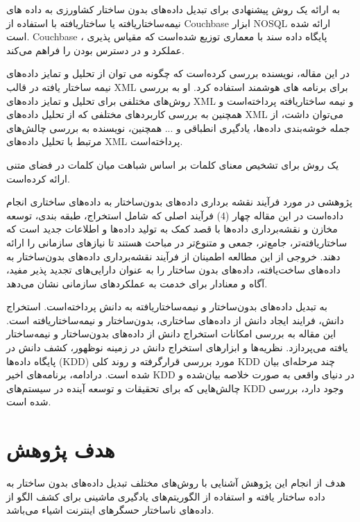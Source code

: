 \cite{sambrekar2018}
به ارائه یک روش پیشنهادی برای تبدیل داده‌های بدون ساختار کشاورزی به داده های نیمه‌ساختار‌یافته یا ساختار‌یافته با استفاده از Couchbase ابزار NOSQL ارائه شده است. Couchbase پایگاه داده سند با معماری توزیع شده‌است که مقیاس پذیری ، عملکرد و در دسترس بودن را فراهم می‌کند.

\cite{tekli2016}
در این مقاله، نویسنده بررسی کرده‌است که چگونه می توان از تحلیل و تمایز داده‌های نیمه ساختار یافته در قالب XML برای برنامه های هوشمند استفاده کرد. او به بررسی روش‌های مختلفی برای تحلیل و تمایز داده‌های XML و نیمه ساختار‌یافته پرداخته‌است و همچنین به بررسی کاربردهای مختلفی که از تحلیل داده‌های XML می‌توان داشت، از جمله خوشه‌بندی داده‌ها، یادگیری انطباقی و ... همچنین، نویسنده به بررسی چالش‌های مرتبط با تحلیل داده‌های XML پرداخته‌است.

\cite{artiles2004}
یک روش برای تشخیص معنای کلمات بر اساس شباهت میان کلمات در فضای متنی ارائه کرده‌است.

\cite{abdullah2013}
پژوهشی در مورد فرآیند نقشه برداری داده‌های بدون‌ساختار به داده‌های ساختاری انجام داده‌است در این مقاله چهار (4) فرآیند اصلی که شامل استخراج، طبقه بندی، توسعه مخازن و نقشه‌برداری داده‌ها با قصد کمک به تولید داده‌ها و اطلاعات جدید است که ساختار‌یافته‌تر، جامع‌تر، جمعی و متنوع‌تر در مباحث هستند تا نیازهای سازمانی را ارائه دهند. خروجی از این مطالعه اطمینان از فرآیند نقشه‌برداری داده‌های بدون‌ساختار به داده‌های ساخت‌یافته، داده‌های بدون ساختار را به عنوان دارایی‌های تجدید پذیر مفید، آگاه و معنادار برای خدمت به عملکردهای سازمانی نشان می‌دهد.

\cite{rusu2013}
به تبدیل داده‌های بدون‌ساختار و نیمه‌ساختار‌یافته به دانش پرداخته‌است. استخراج دانش، فرایند ایجاد دانش از داده‌های ساختاری، بدون‌ساختار و نیمه‌ساختار‌یافته است. این مقاله به بررسی امکانات استخراج دانش از داده‌های بدون‌ساختار و نیمه‌ساختار یافته می‌پردازد. نظریه‌ها و ابزارهای استخراج دانش در زمینه نوظهور، کشف دانش در پایگاه داده‌ها (KDD) مورد بررسی قرار‌گرفته و روند کلی KDD چند مرحله‌ای بیان شده است. درادامه، برنامه‌های اخیر KDD در دنیای واقعی به صورت خلاصه بیان‌شده و چالش‌هایی که برای تحقیقات و توسعه آینده در سیستم‌های KDD وجود دارد، بررسی شده است.

\section{هدف پژوهش}
هدف از انجام این پژوهش آشنایی با روش‌های مختلف تبدیل داده‌های بدون ساختار به داده ساختار یافته و استفاده از الگوریتم‌های یادگیری ماشینی برای کشف الگو از داده‌های ناساختار حسگرهای اینترنت اشیاء می‌باشد.

